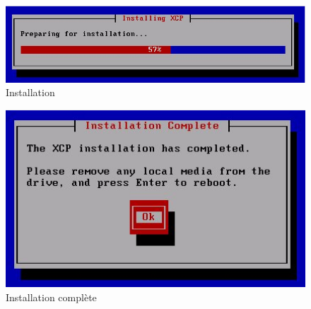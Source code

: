 \begin{figure}
\begin{center}
\includegraphics[width=350pt]{images/10.png}
\end{center}
\caption{Installation}
\end{figure}
\begin{figure}
\begin{center}
\includegraphics[width=350pt]{images/11.png}
\end{center}
\caption{Installation complète}
\end{figure}
